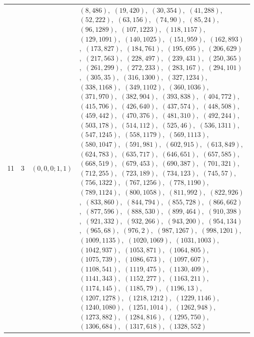 \documentclass[11pt]{article}
\begin{document}
\begin{longtable}{@{}rrl>{\raggedright\arraybackslash}p{}@{}}
11 & 3 & $(0,0,0;1,1)$ & $(8,486)$,\allowbreak\ $(19,420)$,\allowbreak\ $(30,354)$,\allowbreak\ $(41,288)$,\allowbreak\ $(52,222)$,\allowbreak\ $(63,156)$,\allowbreak\ $(74,90)$,\allowbreak\ $(85,24)$,\allowbreak\ $(96,1289)$,\allowbreak\ $(107,1223)$,\allowbreak\ $(118,1157)$,\allowbreak\ $(129,1091)$,\allowbreak\ $(140,1025)$,\allowbreak\ $(151,959)$,\allowbreak\ $(162,893)$,\allowbreak\ $(173,827)$,\allowbreak\ $(184,761)$,\allowbreak\ $(195,695)$,\allowbreak\ $(206,629)$,\allowbreak\ $(217,563)$,\allowbreak\ $(228,497)$,\allowbreak\ $(239,431)$,\allowbreak\ $(250,365)$,\allowbreak\ $(261,299)$,\allowbreak\ $(272,233)$,\allowbreak\ $(283,167)$,\allowbreak\ $(294,101)$,\allowbreak\ $(305,35)$,\allowbreak\ $(316,1300)$,\allowbreak\ $(327,1234)$,\allowbreak\ $(338,1168)$,\allowbreak\ $(349,1102)$,\allowbreak\ $(360,1036)$,\allowbreak\ $(371,970)$,\allowbreak\ $(382,904)$,\allowbreak\ $(393,838)$,\allowbreak\ $(404,772)$,\allowbreak\ $(415,706)$,\allowbreak\ $(426,640)$,\allowbreak\ $(437,574)$,\allowbreak\ $(448,508)$,\allowbreak\ $(459,442)$,\allowbreak\ $(470,376)$,\allowbreak\ $(481,310)$,\allowbreak\ $(492,244)$,\allowbreak\ $(503,178)$,\allowbreak\ $(514,112)$,\allowbreak\ $(525,46)$,\allowbreak\ $(536,1311)$,\allowbreak\ $(547,1245)$,\allowbreak\ $(558,1179)$,\allowbreak\ $(569,1113)$,\allowbreak\ $(580,1047)$,\allowbreak\ $(591,981)$,\allowbreak\ $(602,915)$,\allowbreak\ $(613,849)$,\allowbreak\ $(624,783)$,\allowbreak\ $(635,717)$,\allowbreak\ $(646,651)$,\allowbreak\ $(657,585)$,\allowbreak\ $(668,519)$,\allowbreak\ $(679,453)$,\allowbreak\ $(690,387)$,\allowbreak\ $(701,321)$,\allowbreak\ $(712,255)$,\allowbreak\ $(723,189)$,\allowbreak\ $(734,123)$,\allowbreak\ $(745,57)$,\allowbreak\ $(756,1322)$,\allowbreak\ $(767,1256)$,\allowbreak\ $(778,1190)$,\allowbreak\ $(789,1124)$,\allowbreak\ $(800,1058)$,\allowbreak\ $(811,992)$,\allowbreak\ $(822,926)$,\allowbreak\ $(833,860)$,\allowbreak\ $(844,794)$,\allowbreak\ $(855,728)$,\allowbreak\ $(866,662)$,\allowbreak\ $(877,596)$,\allowbreak\ $(888,530)$,\allowbreak\ $(899,464)$,\allowbreak\ $(910,398)$,\allowbreak\ $(921,332)$,\allowbreak\ $(932,266)$,\allowbreak\ $(943,200)$,\allowbreak\ $(954,134)$,\allowbreak\ $(965,68)$,\allowbreak\ $(976,2)$,\allowbreak\ $(987,1267)$,\allowbreak\ $(998,1201)$,\allowbreak\ $(1009,1135)$,\allowbreak\ $(1020,1069)$,\allowbreak\ $(1031,1003)$,\allowbreak\ $(1042,937)$,\allowbreak\ $(1053,871)$,\allowbreak\ $(1064,805)$,\allowbreak\ $(1075,739)$,\allowbreak\ $(1086,673)$,\allowbreak\ $(1097,607)$,\allowbreak\ $(1108,541)$,\allowbreak\ $(1119,475)$,\allowbreak\ $(1130,409)$,\allowbreak\ $(1141,343)$,\allowbreak\ $(1152,277)$,\allowbreak\ $(1163,211)$,\allowbreak\ $(1174,145)$,\allowbreak\ $(1185,79)$,\allowbreak\ $(1196,13)$,\allowbreak\ $(1207,1278)$,\allowbreak\ $(1218,1212)$,\allowbreak\ $(1229,1146)$,\allowbreak\ $(1240,1080)$,\allowbreak\ $(1251,1014)$,\allowbreak\ $(1262,948)$,\allowbreak\ $(1273,882)$,\allowbreak\ $(1284,816)$,\allowbreak\ $(1295,750)$,\allowbreak\ $(1306,684)$,\allowbreak\ $(1317,618)$,\allowbreak\ $(1328,552)$\\

\end{longtable}
\end{document}
